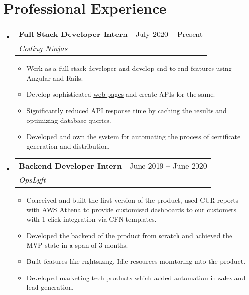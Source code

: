 \documentclass[letterpaper,11pt]{article}
\makeatletter
\newcommand{\resumeItem}[1]{
  \item\small{
    {#1 \vspace{-2pt}}
  }
}
\newcommand{\resumeSubheading}[4]{
  \vspace{-2pt}\item
    \begin{tabular*}{0.97\textwidth}[t]{l@{\extracolsep{\fill}}r}
      \textbf{#1} & #2 \\
      \textit{\small#3} & \textit{\small #4} \\
    \end{tabular*}\vspace{-7pt}
}
\newcommand{\resumeSubSubheading}[2]{
    \item
    \begin{tabular*}{0.97\textwidth}{l@{\extracolsep{\fill}}r}
      \textit{\small#1} & \textit{\small #2} \\
    \end{tabular*}\vspace{-7pt}
}
\newcommand{\resumeSubHeadingListStart}{\begin{itemize}[leftmargin=0.15in, label={}]}
\newcommand{\resumeSubHeadingListEnd}{\end{itemize}}
\newcommand{\resumeItemListStart}{\begin{itemize}}
\newcommand{\resumeItemListEnd}{\end{itemize}\vspace{-5pt}}
\makeatother
\begin{document}
\section{Professional Experience}
  \resumeSubHeadingListStart

    \resumeSubheading
      {Full Stack Developer Intern}{July 2020 -- Present}
      {Coding Ninjas}{}
      \resumeItemListStart
        \resumeItem{Work as a full-stack developer and develop end-to-end features using Angular and Rails.}
        \resumeItem{Develop sophisticated \href{https://www.codingninjas.com/courses/premium-foundation-course}{web pages} and create APIs for the same.}
        \resumeItem{Significantly reduced API response time by caching the results and optimizing database queries.}
        \resumeItem{Developed and own the system for automating the process of certificate generation and distribution.}
      \resumeItemListEnd
      

    \resumeSubheading
      {Backend Developer Intern}{June 2019 -- June 2020}
      {OpsLyft}{}
      \resumeItemListStart
        \resumeItem{Conceived and built the first version of the product, used CUR reports with AWS Athena to provide customised dashboards to our customers with 1-click integration via CFN templates.}
        \resumeItem{Developed the backend of the product from scratch and achieved the MVP state in a span of 3 months.}
        \resumeItem{Built features like rightsizing, Idle resources monitoring into the product.}
        \resumeItem{Developed marketing tech products which added automation in sales and lead generation.}
    \resumeItemListEnd
  \resumeSubHeadingListEnd


\end{document}

